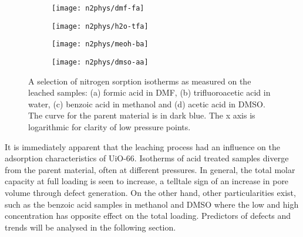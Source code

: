 \begin{figure}[htbp]
	\centering

	\begin{subfigure}{0.45\linewidth}
		\texttt{[image: n2phys/dmf-fa]}%
		\caption{}%
		\label{def:fgr:n2phys-dmf-fa}
	\end{subfigure}
	\begin{subfigure}{0.45\linewidth}
		\texttt{[image: n2phys/h2o-tfa]}%
		\caption{}%
		\label{def:fgr:n2phys-h2o-tfa}
	\end{subfigure}

	\begin{subfigure}{0.45\linewidth}
		\texttt{[image: n2phys/meoh-ba]}%
		\caption{}%
		\label{def:fgr:n2phys-meoh-ba}
	\end{subfigure}
	\begin{subfigure}{0.45\linewidth}
		\texttt{[image: n2phys/dmso-aa]}%
		\caption{}%
		\label{def:fgr:n2phys-dmso-aa}
	\end{subfigure}

	\caption{A selection of nitrogen sorption isotherms as measured on the
		leached samples: (a) formic acid in DMF, (b) trifluoroacetic
		acid in water, (c) benzoic acid in methanol and (d) acetic acid
        in DMSO. The curve for the parent material is in dark blue.
        The x axis is logarithmic for clarity of low pressure 
        points.}%
	\label{def:fgr:n2phys-dataset}
\end{figure}

It is immediately apparent that the leaching process had an influence 
on the adsorption characteristics of UiO-66. Isotherms of acid treated
samples diverge from the parent material, often at different pressures.
In general, the total molar capacity at full loading is seen to increase,
a telltale sign of an increase in pore volume through defect generation.
On the other hand, other particularities exist, such as the benzoic acid
samples in methanol and DMSO where the low and high
concentration has opposite effect on the total loading. Predictors 
of defects and trends will be analysed in the following section.